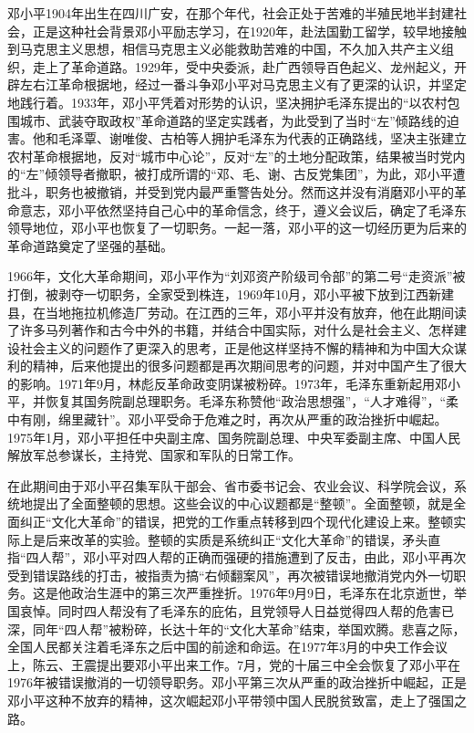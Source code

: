 \documentclass[cs4size,a4paper,nofonts]{ctexart}
\begin{document}
\newpage


邓小平1904年出生在四川广安，在那个年代，社会正处于苦难的半殖民地半封建社会，正是这种社会背景邓小平励志学习，在1920年，赴法国勤工留学，较早地接触到马克思主义思想，相信马克思主义必能救助苦难的中国，不久加入共产主义组织，走上了革命道路。1929年，受中央委派，赴广西领导百色起义、龙州起义，开辟左右江革命根据地，经过一番斗争邓小平对马克思主义有了更深的认识，并坚定地践行着。1933年，邓小平凭着对形势的认识，坚决拥护毛泽东提出的“以农村包围城市、武装夺取政权”革命道路的坚定实践者，为此受到了当时“左”倾路线的迫害。他和毛泽覃、谢唯俊、古柏等人拥护毛泽东为代表的正确路线，坚决主张建立农村革命根据地，反对“城市中心论”，反对“左”的土地分配政策，结果被当时党内的“左”倾领导者撤职，被打成所谓的“邓、毛、谢、古反党集团”，为此，邓小平遭批斗，职务也被撤销，并受到党内最严重警告处分。然而这并没有消磨邓小平的革命意志，邓小平依然坚持自己心中的革命信念，终于，遵义会议后，确定了毛泽东领导地位，邓小平也恢复了一切职务。一起一落，邓小平的这一切经历更为后来的革命道路奠定了坚强的基础。

1966年，文化大革命期间，邓小平作为“刘邓资产阶级司令部”的第二号“走资派”被打倒，被剥夺一切职务，全家受到株连，1969年10月，邓小平被下放到江西新建县，在当地拖拉机修造厂劳动。在江西的三年，邓小平并没有放弃，他在此期间读了许多马列著作和古今中外的书籍，并结合中国实际，对什么是社会主义、怎样建设社会主义的问题作了更深入的思考，正是他这样坚持不懈的精神和为中国大众谋利的精神，后来他提出的很多问题都是再次期间思考的问题，并对中国产生了很大的影响。1971年9月，林彪反革命政变阴谋被粉碎。1973年，毛泽东重新起用邓小平，并恢复其国务院副总理职务。毛泽东称赞他“政治思想强”，“人才难得”，“柔中有刚，绵里藏针”。邓小平受命于危难之时，再次从严重的政治挫折中崛起。1975年1月，邓小平担任中央副主席、国务院副总理、中央军委副主席、中国人民解放军总参谋长，主持党、国家和军队的日常工作。

在此期间由于邓小平召集军队干部会、省市委书记会、农业会议、科学院会议，系统地提出了全面整顿的思想。这些会议的中心议题都是“整顿”。全面整顿，就是全面纠正“文化大革命”的错误，把党的工作重点转移到四个现代化建设上来。整顿实际上是后来改革的实验。整顿的实质是系统纠正“文化大革命”的错误，矛头直指“四人帮”，邓小平对四人帮的正确而强硬的措施遭到了反击，由此，邓小平再次受到错误路线的打击，被指责为搞“右倾翻案风”，再次被错误地撤消党内外一切职务。这是他政治生涯中的第三次严重挫折。1976年9月9日，毛泽东在北京逝世，举国哀悼。同时四人帮没有了毛泽东的庇佑，且党领导人日益觉得四人帮的危害已深，同年“四人帮”被粉碎，长达十年的“文化大革命”结束，举国欢腾。悲喜之际，全国人民都关注着毛泽东之后中国的前途和命运。在1977年3月的中央工作会议上，陈云、王震提出要邓小平出来工作。7月，党的十届三中全会恢复了邓小平在1976年被错误撤消的一切领导职务。邓小平第三次从严重的政治挫折中崛起，正是邓小平这种不放弃的精神，这次崛起邓小平带领中国人民脱贫致富，走上了强国之路。
\end{document}

